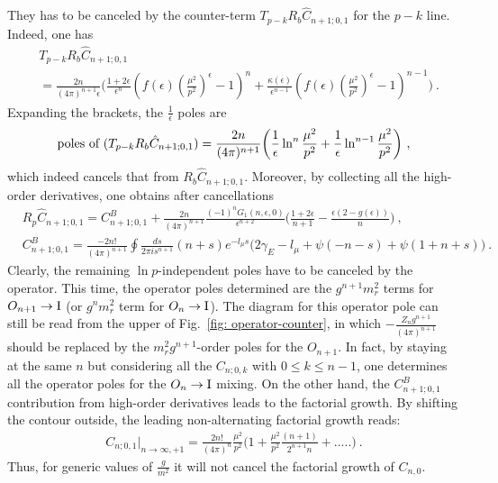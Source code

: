 \documentclass[a4paper,11pt]{article}
\begin{document}
They has to be canceled by the counter-term $T_{p-k}R_b\hat C_{n+1;0,1}$ for the $p-k$ line. Indeed, one has
\begin{align}
&T_{p-k}R_b\hat C_{n+1;0,1}\nonumber \\ 
&=\frac{2n}{(4\pi)^{n+1}\epsilon}\bigg(\frac{1+2\epsilon}{\epsilon^n}\left(f(\epsilon)\left(\frac{\mu^2}{p^2}\right)^{\epsilon}-1\right)^n+\frac{\kappa(\epsilon)}{\epsilon^{n-1}}\left(f(\epsilon)\left(\frac{\mu^2}{p^2}\right)^{\epsilon}-1\right)^{n-1}\bigg) \ .
\end{align}
Expanding the brackets, the $\frac{1}{\epsilon}$ poles are
\begin{align}
\text{\rm poles of }(T_{p-k}R_b\hat C_{n+1;0,1})=\frac{2n}{(4\pi)^{n+1}}\bigg(\frac{1}{\epsilon}\ln^n\frac{\mu^2}{p^2}+\frac{1}{\epsilon}\ln^{n-1}\frac{\mu^2}{p^2}\bigg) \ ,
\end{align}
which indeed cancels that from $R_b\hat C_{n+1;0,1}$. Moreover, by collecting all the high-order derivatives, one obtains after cancellations
\begin{align}
&R_p\hat C_{n+1;0,1}=C^B_{n+1;0,1}+\frac{2n}{(4\pi)^{n+1}}\frac{(-1)^nG_1(n,\epsilon,0)}{\epsilon^{n+2}}\bigg(\frac{1+2\epsilon}{n+1}-\frac{\epsilon(2-g(\epsilon))}{n}\bigg)\ ,  \\ 
&C_{n+1;0,1}^B=\frac{-2n!}{(4\pi)^{n+1}}\oint \frac{ds}{2\pi is^{n+1}}\left(n+s\right)e^{-l_{\mu}s}\bigg(2\gamma_E-l_{\mu}+\psi(-n-s)+\psi(1+n+s)\bigg) \ . \label{eq:Cmassb}
\end{align}
Clearly, the remaining $\ln p$-independent poles have to be canceled by the operator. This time, the operator poles determined are the $g^{n+1}m_r^2$ terms for $O_{n+1}\rightarrow{\rm I}$ (or $g^{n}m_r^2$ term for $O_n\rightarrow{\rm I}$). The diagram for this operator pole can still be read from the upper of Fig.~\ref{fig: operator-counter}, in which $-\frac{Z_ng^{n+1}}{(4\pi)^{n+1}}$ should be replaced by the $m_r^2g^{n+1}$-order poles for the $O_{n+1}$. In fact, by staying at the same $n$ but considering all the $C_{n;0,k}$ with $0\le k\le n-1$, one determines all the operator poles for the $O_n \rightarrow{\rm I}$ mixing. On the other hand, the $C_{n+1;0,1}^B$ contribution from high-order derivatives leads to the factorial growth. By shifting the contour outside, the leading non-alternating factorial growth reads:
\begin{align}\label{eq:massfac1}
C_{n;0,1}\bigg|_{n\rightarrow\infty, +1}=\frac{2n!}{(4\pi)^n}\frac{\mu^2}{p^2}\bigg(1+\frac{\mu^2}{p^2}\frac{(n+1)}{2^{n+1}n}+.....\bigg)\ .
\end{align}
Thus, for generic values of $\frac{g}{m^2}$ it will not cancel the factorial growth of $C_{n,0}$. 
\end{document}
